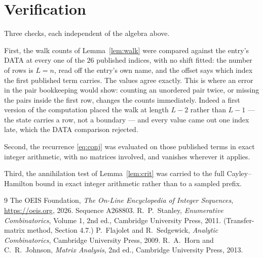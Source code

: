\documentclass[11pt,a4paper]{article}
\theoremstyle{plain}
\theoremstyle{definition}
\begin{document}
\section{Verification}

Three checks, each independent of the algebra above.

First, the walk counts of Lemma~\ref{lem:walk} were compared against the entry's DATA at
every one of the $26$ published indices, with no shift fitted: the number of rows is
$L=n$, read off the entry's own name, and the offset says which index the first
published term carries. The values agree exactly. This is where an error in the pair
bookkeeping would show: counting an unordered pair twice, or missing the pairs inside the
first row, changes the counts immediately. Indeed a first version of the computation
placed the walk at length $L-2$ rather than $L-1$ --- the state carries a row, not a
boundary --- and every value came out one index late, which the DATA comparison rejected.

Second, the recurrence \eqref{eq:conj} was evaluated on those published terms in exact
integer arithmetic, with no matrices involved, and vanishes wherever it applies.

Third, the annihilation test of Lemma~\ref{lem:crit} was carried to the full
Cayley--Hamilton bound in exact integer arithmetic rather than to a sampled prefix.

\begin{thebibliography}{9}
 The OEIS Foundation, \emph{The On-Line Encyclopedia of Integer
Sequences}, \url{https://oeis.org}, 2026. Sequence A268803.
 R.~P.~Stanley, \emph{Enumerative Combinatorics}, Volume 1, 2nd ed.,
Cambridge University Press, 2011. (Transfer-matrix method, Section 4.7.)
 P.~Flajolet and R.~Sedgewick, \emph{Analytic Combinatorics}, Cambridge
University Press, 2009.
 R.~A.~Horn and C.~R.~Johnson, \emph{Matrix Analysis}, 2nd ed., Cambridge
University Press, 2013.
\end{thebibliography}
\end{document}

